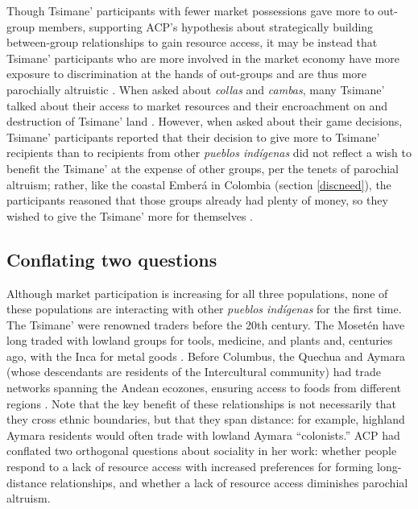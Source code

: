 \documentclass[bibauthoryear]{aa}
\begin{document}
Though Tsimane' participants with fewer market possessions gave more to out-group members, supporting ACP's hypothesis about strategically building between-group relationships to gain resource access, it may be instead that Tsimane' participants who are more involved in the market economy have more exposure to discrimination at the hands of out-groups and are thus more parochially altruistic \citep{pisor2018diversify}. When asked about \textit{collas} and \textit{cambas}, many Tsimane' talked about their access to market resources and their encroachment on and destruction of Tsimane' land \citep{pisor2018diversify}. However, when asked about their game decisions, Tsimane' participants reported that their decision to give more to Tsimane' recipients than to recipients from other \textit{pueblos ind\'igenas} did not reflect a wish to benefit the Tsimane' at the expense of other groups, per the tenets of parochial altruism; rather, like the coastal Ember\'a in Colombia (section \ref{discneed}), the participants reasoned that those groups already had plenty of money, so they wished to give the Tsimane' more for themselves \citep{Pisor2020}.
	

\subsection{Conflating two questions}\label{twoquest}

Although market participation is increasing for all three populations, none of these populations are interacting with other \textit{pueblos ind\'igenas} for the first time. The Tsimane' were renowned traders before the 20th century. The Moset\'en have long traded with lowland groups for tools, medicine, and plants \citep{lathrap1973antiquity, ringhofer2010exploring} and, centuries ago, with the Inca for metal goods \citep{godoy2015natural}. Before  Columbus, the Quechua and Aymara (whose descendants are residents of the Intercultural community) had trade networks spanning the Andean ecozones, ensuring access to foods from different regions \citep{klein2011concise}. Note that the key benefit of these relationships is not necessarily that they cross ethnic boundaries, but that they span distance: for example, highland Aymara residents would often trade with lowland Aymara ``colonists.'' ACP had conflated two orthogonal questions about sociality in her work: whether people respond to a lack of resource access with increased preferences for forming long-distance   relationships, and whether a lack of resource access diminishes parochial altruism.
\end{document}
